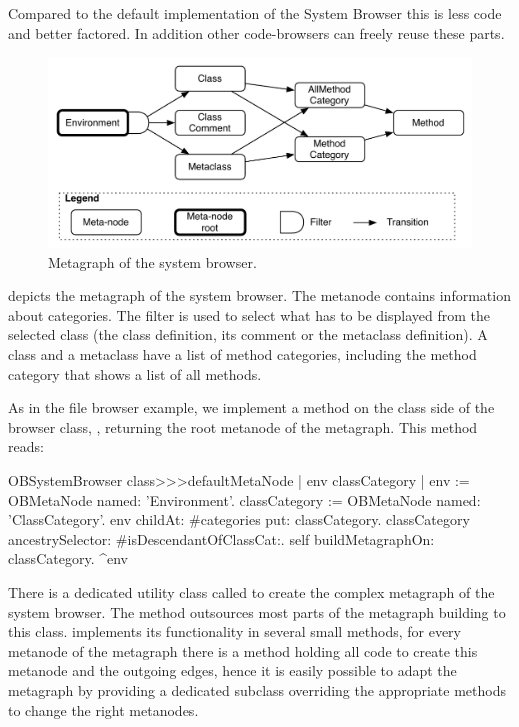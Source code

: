 \documentclass[a4paper,10pt,twoside]{book}
\begin{document}
Compared to the default implementation of the \pharo System Browser this is less code and better factored. In addition other code-browsers can freely reuse these parts.

\begin{figure}[!ht]
\begin{center}
\includegraphics[width=\textwidth]{ob-graph}
\caption{Metagraph of the system browser.} 
\end{center}
\end{figure}

 depicts the metagraph of the system browser. The metanode  contains information about categories. The filter is used to select what has to be displayed from the selected class (\ie the class definition, its comment or the metaclass definition). A class and a metaclass have a list of method categories, including the  method category that shows a list of all methods.

As in the file browser example, we implement a method  on the class side of the browser class, \ie {}, returning the root metanode of the metagraph. This method reads:
\begin{code}{}
OBSystemBrowser class>>>defaultMetaNode
	| env classCategory |
	env := OBMetaNode named: 'Environment'.
	classCategory := OBMetaNode named: 'ClassCategory'.
	env childAt: #categories put: classCategory.
	classCategory ancestrySelector: #isDescendantOfClassCat:.
	self buildMetagraphOn: classCategory.
	^env
\end{code}

There is a dedicated utility class called  to create the complex metagraph of the system browser. The method  outsources most parts of the metagraph building to this class.  implements its functionality in several small methods, \ie for every metanode of the metagraph there is a method holding all code to create this metanode and the outgoing edges, hence it is easily possible to adapt the metagraph by providing a dedicated subclass overriding the appropriate methods to change the right metanodes. 
\end{document}
